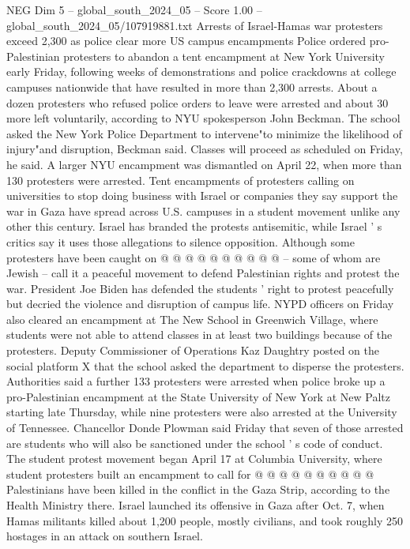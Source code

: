 \begin{textsample}{NEG Dim 5 – global\_south\_2024\_05 – Score 1.00 – global\_south\_2024\_05/107919881.txt}  \label{ex:f5_neg_330}
Arrests of Israel-Hamas war protesters exceed 2,300 as police clear more US campus encampments Police ordered pro-Palestinian protesters to abandon a tent encampment at New York University early Friday, following weeks of demonstrations and police crackdowns at college campuses nationwide that have resulted in more than 2,300 arrests.
About a dozen protesters who refused police orders to leave were arrested and about 30 more left voluntarily, according to NYU spokesperson John Beckman.
The school asked the New York Police Department to intervene"to minimize the likelihood of injury"and disruption, Beckman said.
Classes will proceed as scheduled on Friday, he said.
A larger NYU encampment was dismantled on April 22, when more than 130 protesters were arrested.
Tent encampments of protesters calling on universities to stop doing business with Israel or companies they say support the war in Gaza have spread across U.S. campuses in a student movement unlike any other this century.
Israel has branded the protests antisemitic, while Israel ' s critics say it uses those allegations to silence opposition.
Although some protesters have been caught on @ @ @ @ @ @ @ @ @ @ -- some of whom are Jewish -- call it a peaceful movement to defend Palestinian rights and protest the war.
President Joe Biden has defended the students ' right to protest peacefully but decried the violence and disruption of campus life.
NYPD officers on Friday also cleared an encampment at The New School in Greenwich Village, where students were not able to attend classes in at least two buildings because of the protesters.
Deputy Commissioner of Operations Kaz Daughtry posted on the social platform X that the school asked the department to disperse the protesters.
Authorities said a further 133 protesters were arrested when police broke up a pro-Palestinian encampment at the State University of New York at New Paltz starting late Thursday, while nine protesters were also arrested at the University of Tennessee.
Chancellor Donde Plowman said Friday that seven of those arrested are students who will also be sanctioned under the school ' s code of conduct.
The student protest movement began April 17 at Columbia University, where student protesters built an encampment to call for @ @ @ @ @ @ @ @ @ @ Palestinians have been killed in the conflict in the Gaza Strip, according to the Health Ministry there.
Israel launched its offensive in Gaza after Oct. 7, when Hamas militants killed about 1,200 people, mostly civilians, and took roughly 250 hostages in an attack on southern Israel.

\end{textsample}
